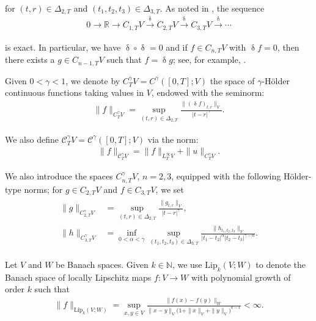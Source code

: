 \documentclass[letterpaper, 11pt,  reqno]{amsart}
\newcommand{\1}{\hspace{0.5mm}\text{I}\hspace{0.5mm}}
\newcommand{\noi}{\noindent}
\newcommand{\R}{\mathbb{R}}
\newcommand{\CC}{\mathcal{C}}
\newcommand{\al}{\alpha}
\newcommand{\updl}{\updelta}
\newcommand{\Dl}{\Delta}
\newcommand{\g}{\gamma}
\newcommand{\N}{\mathbb{N}}
\newcommand{\Lip}{\mathrm{Lip}}
\newcommand{\too}{\longrightarrow}
\numberwithin{equation}{section}
\numberwithin{theorem}{section}
\begin{document}
\noi
for $(t,r)\in\Dl_{2,T}$
and $(t_1,t_2,t_3) \in \Dl_{3,T}$.
As noted in \cite{GT10}, 
the sequence 
\begin{align*}
0 \too \R \too C_{1, T}V \stackrel{\updl}{\too} C_{2, T}V
\stackrel{\updl}{\too} C_{3, T}V
\stackrel{\updl}{\too} \cdots
\end{align*}

\noi
is exact. 
In particular, we have 
 $\updl\circ\updl =0$ and 
if $f \in C_{n,T} V$ with $\updl f =0$, 
then there exists a $g\in C_{n-1,T}V$ 
such that $f= \updl g$; 
see, for example,  \cite[Lemma 2.1]{GT10}. 


Given $0 < \g < 1$, we denote by $C^\g_T V = C^\g([0, T]; V)$ the space of $\g$-H\"older continuous functions taking values in $V$, endowed  with the seminorm:
\begin{align*}
\|f\|_{C^\g_T V} = \sup_{(t,r)\in \Dl_{2,T}} 
\frac{\|(\updl f)_{t,r}\|_V}{|t-r|^\g}.
\end{align*}

\noi
We also define 
 $\CC^\g_T V = \CC^\g([0, T]; V)$ via the norm:
\begin{align}
\| f \|_{\CC^\g_TV} = \| f \|_{L^\infty_TV} + \|u\|_{C^\g_T V}.
\label{Ho2a}
\end{align}


\noi 
We also introduce the spaces 
$C^\g_{n,T}V$, $n=2,3$, 
equipped with the following H\"older-type norms;
 for $g\in C_{2,T}V$ and $f\in C_{3,T}V$, we set
\begin{align}
\begin{split}
\| g\|_{C^\g_{2,T} V} & 
= \sup_{(t,r) \in \Dl_{2,T}} \frac{\|g_{t,r} \|_{V} }{|t-r|^{\g}}, \\
\| h\|_{C^\g_{3,T} V} & 
= \inf_{0<\al<\g} 
\sup_{(t_1,t_2,t_3) \in \Dl_{3,T}} 
\frac{ \|h_{t_1,t_2,t_3}\|_V}
{|t_1-t_2|^{\al} |t_2-t_3|^{\g-\al}}.
\end{split}
\label{Ho2}
\end{align}




\medskip


Let $V$ and $W$ be Banach spaces.
Given $k \in \N$, 
we  use $\Lip_k(V; W)$ 
to denote the Banach space of 
locally Lipschitz maps $f:V\to W$
with polynomial growth of order $k$
such that 
\begin{align}
\|f\|_{\Lip_k(V; W)} = 
\sup_{x,y\in V} 
\frac{\|f(x)-f(y)\|_W}{\|x-y\|_V \big(1+\|x\|_V+\|y\|_V\big)^{k-1}}
<\infty .
\label{Lip1}
\end{align}
\end{document}
